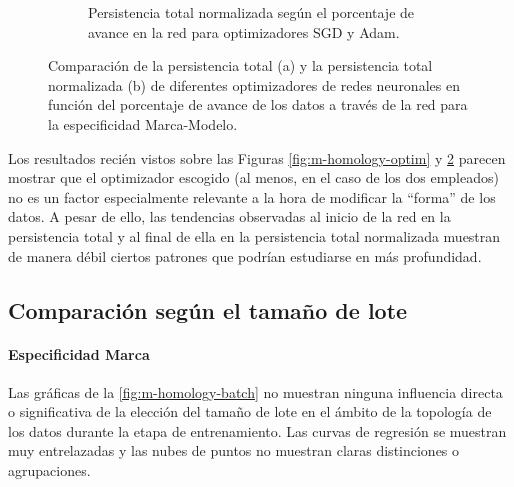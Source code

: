 \begin{figure}[H]
\begin{subfigure}{.5\textwidth}
		\caption{Persistencia total normalizada según el porcentaje de avance en la red para optimizadores SGD y Adam.}
		\label{fig:mm-homology-optim-2}
	\end{subfigure}
	\caption{Comparación de la persistencia total (a) y la persistencia total normalizada (b) de diferentes optimizadores de redes neuronales en función del porcentaje de avance de los datos a través de la red para la especificidad Marca-Modelo.}
	\label{fig:mm-homology-optim}
\end{figure}

Los resultados recién vistos sobre las Figuras \ref{fig:m-homology-optim} y \ref{fig:mm-homology-optim} parecen mostrar que el optimizador escogido (al menos, en el caso de los dos empleados) no es un factor especialmente relevante a la hora de modificar la \enquote{forma} de los datos. A pesar de ello, las tendencias observadas al inicio de la red en la persistencia total y al final de ella en la persistencia total normalizada muestran de manera débil ciertos patrones que podrían estudiarse en más profundidad.

\subsection{Comparación según el tamaño de lote}
\label{subsec:batch}

\paragraph{Especificidad Marca}

Las gráficas de la \autoref{fig:m-homology-batch} no muestran ninguna influencia directa o significativa de la elección del tamaño de lote en el ámbito de la topología de los datos durante la etapa de entrenamiento. Las curvas de regresión se muestran muy entrelazadas y las nubes de puntos no muestran claras distinciones o agrupaciones.

